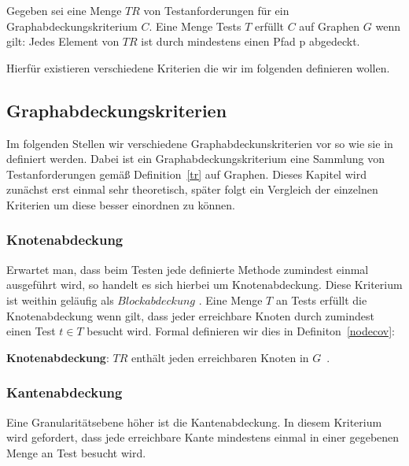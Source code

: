 \begin{definition}
    Gegeben sei eine Menge $TR$ von Testanforderungen für ein Graphabdeckungskriterium $C$.
    Eine Menge Tests $T$ erfüllt $C$ auf Graphen $G$ wenn gilt: Jedes Element von $TR$ ist durch mindestens einen Pfad p abgedeckt.
    \cite[vgl. Def. 2.32]{software-testing}
    \label{graphcov}
\end{definition}

Hierfür existieren verschiedene Kriterien die wir im folgenden definieren wollen.

\subsection{Graphabdeckungskriterien}

Im folgenden Stellen wir verschiedene Graphabdeckunskriterien vor so wie sie in~\cite{software-testing} definiert werden.
Dabei ist ein Graphabdeckungskriterium eine Sammlung von Testanforderungen gemäß Definition~\ref{tr} auf Graphen.
Dieses Kapitel wird zunächst erst einmal sehr theoretisch, später folgt ein Vergleich der einzelnen Kriterien um diese besser einordnen zu können.

\subsubsection{Knotenabdeckung}

Erwartet man, dass beim Testen jede definierte Methode zumindest einmal ausgeführt wird, so handelt es sich hierbei um Knotenabdeckung.
Diese Kriterium ist weithin geläufig als $Blockabdeckung$ \cite[vgl. 2.2.1]{software-testing}.
Eine Menge $T$ an Tests erfüllt die Knotenabdeckung wenn gilt, dass jeder erreichbare Knoten durch zumindest einen Test $t \in T$ besucht wird.
Formal definieren wir dies in Definiton~\ref{nodecov}: 

\begin{definition}
    \textbf{Knotenabdeckung}: $TR$ enthält jeden erreichbaren Knoten in $G$~\cite[vgl. Criterion 2.1]{software-testing}.
    \label{nodecov}
\end{definition}


\subsubsection{Kantenabdeckung}
\label{kantenabdeck}
Eine Granularitätsebene höher ist die Kantenabdeckung.
In diesem Kriterium wird gefordert, dass jede erreichbare Kante mindestens einmal in einer gegebenen Menge an Test besucht wird.


